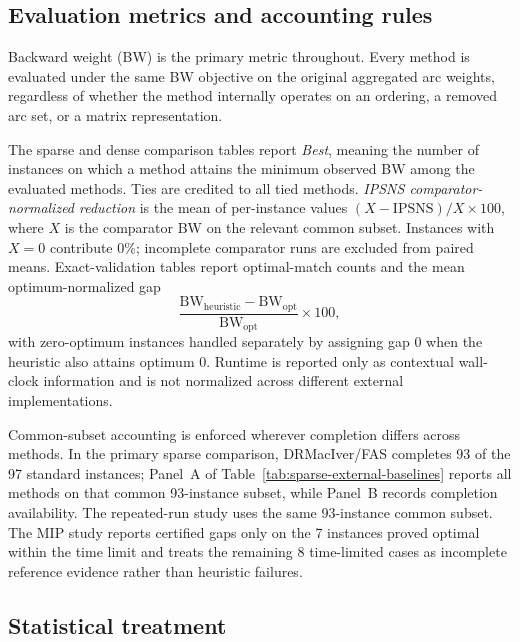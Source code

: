 \subsection{Evaluation metrics and accounting rules}

Backward weight (BW) is the primary metric throughout. Every method is evaluated under the same BW objective on the original aggregated arc weights, regardless of whether the method internally operates on an ordering, a removed arc set, or a matrix representation.

The sparse and dense comparison tables report \emph{Best}, meaning the number of instances on which a method attains the minimum observed BW among the evaluated methods. Ties are credited to all tied methods. \emph{IPSNS comparator-normalized reduction} is the mean of per-instance values \((X-\mathrm{IPSNS})/X\times 100\), where \(X\) is the comparator BW on the relevant common subset. Instances with \(X=0\) contribute 0\%; incomplete comparator runs are excluded from paired means. Exact-validation tables report optimal-match counts and the mean optimum-normalized gap
\[
\frac{\mathrm{BW}_{\mathrm{heuristic}}-\mathrm{BW}_{\mathrm{opt}}}{\mathrm{BW}_{\mathrm{opt}}}\times 100,
\]
with zero-optimum instances handled separately by assigning gap 0 when the heuristic also attains optimum 0. Runtime is reported only as contextual wall-clock information and is not normalized across different external implementations.

Common-subset accounting is enforced wherever completion differs across methods. In the primary sparse comparison, DRMacIver/FAS completes 93 of the 97 standard instances; Panel~A of Table~\ref{tab:sparse-external-baselines} reports all methods on that common 93-instance subset, while Panel~B records completion availability. The repeated-run study uses the same 93-instance common subset. The MIP study reports certified gaps only on the 7 instances proved optimal within the time limit and treats the remaining 8 time-limited cases as incomplete reference evidence rather than heuristic failures.

\subsection{Statistical treatment}

